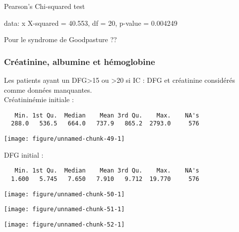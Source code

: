 \documentclass[11pt,a4paper]{article}\usepackage[]{graphicx}\usepackage[]{color}
\makeatletter
\def\maxwidth{ %
  \ifdim\Gin@nat@width>\linewidth
    \linewidth
  \else
    \Gin@nat@width
  \fi
}
\newenvironment{kframe}{%
 \def\at@end@of@kframe{}%
 \ifinner\ifhmode%
  \def\at@end@of@kframe{\end{minipage}}%
  \begin{minipage}{\columnwidth}%
 \fi\fi%
 \def\FrameCommand##1{\hskip\@totalleftmargin \hskip-\fboxsep
 \colorbox{shadecolor}{##1}\hskip-\fboxsep
     \hskip-\linewidth \hskip-\@totalleftmargin \hskip\columnwidth}%
 \MakeFramed {\advance\hsize-\width
   \@totalleftmargin\z@ \linewidth\hsize
   \@setminipage}}%
 {\par\unskip\endMakeFramed%
 \at@end@of@kframe}
\newenvironment{knitrout}{}{} %
\makeatother
\begin{document}
	Pearson's Chi-squared test

data:  x
X-squared = 40.553, df = 20, p-value = 0.004249



Pour le syndrome de Goodpasture ??


    \subsubsection{Créatinine, albumine et hémoglobine}

Les patients ayant un DFG\textgreater15 ou \textgreater20 si IC : DFG et créatinine considérés comme données manquantes.
~\\

Créatininémie initiale :

\begin{knitrout}
\color{fgcolor}\begin{kframe}
\begin{verbatim}
   Min. 1st Qu.  Median    Mean 3rd Qu.    Max.    NA's 
  288.0   536.5   664.0   737.9   865.2  2793.0     576 
\end{verbatim}
\end{kframe}
\texttt{[image: figure/unnamed-chunk-49-1]} 

\end{knitrout}

DFG initial :

\begin{knitrout}
\color{fgcolor}\begin{kframe}
\begin{verbatim}
   Min. 1st Qu.  Median    Mean 3rd Qu.    Max.    NA's 
  1.600   5.745   7.650   7.910   9.712  19.770     576 
\end{verbatim}
\end{kframe}
\texttt{[image: figure/unnamed-chunk-50-1]} 

\end{knitrout}

\begin{knitrout}
\color{fgcolor}
\texttt{[image: figure/unnamed-chunk-51-1]} 

\end{knitrout}

\begin{knitrout}
\color{fgcolor}
\texttt{[image: figure/unnamed-chunk-52-1]} 

\end{knitrout}
\end{document}
